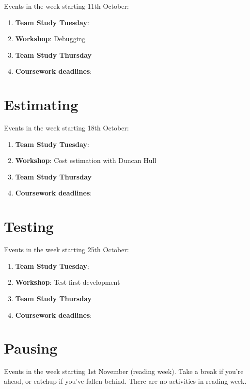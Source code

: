 \documentclass[
]{book}
\providecommand{\tightlist}{%
  \setlength{\itemsep}{0pt}\setlength{\parskip}{0pt}}
\begin{document}
Events in the week starting 11th October:

\begin{enumerate}
\def\labelenumi{\arabic{enumi}.}
\tightlist
\item
  \textbf{Team Study Tuesday}:
\item
  \textbf{Workshop}: Debugging
\item
  \textbf{Team Study Thursday}
\item
  \textbf{Coursework deadlines}:
\end{enumerate}

\hypertarget{week4}{%
\section{Estimating}\label{week4}}

Events in the week starting 18th October:

\begin{enumerate}
\def\labelenumi{\arabic{enumi}.}
\tightlist
\item
  \textbf{Team Study Tuesday}:
\item
  \textbf{Workshop}: Cost estimation with Duncan Hull
\item
  \textbf{Team Study Thursday}
\item
  \textbf{Coursework deadlines}:
\end{enumerate}

\hypertarget{week5}{%
\section{Testing}\label{week5}}

Events in the week starting 25th October:

\begin{enumerate}
\def\labelenumi{\arabic{enumi}.}
\tightlist
\item
  \textbf{Team Study Tuesday}:
\item
  \textbf{Workshop}: Test first development
\item
  \textbf{Team Study Thursday}
\item
  \textbf{Coursework deadlines}:
\end{enumerate}

\hypertarget{week6}{%
\section{Pausing}\label{week6}}

Events in the week starting 1st November (reading week). Take a break if you're ahead, or catchup if you've fallen behind. There are no activities in reading week.
\end{document}
